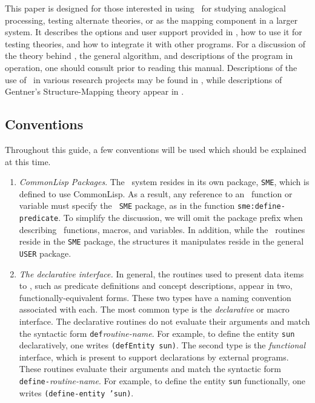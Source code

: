 This paper is designed for those interested in using \SME\ for studying
analogical processing, testing alternate theories, or as the mapping
component in a larger system. It describes the options and user support
provided in \SME, how to use it for testing theories, and how to integrate
it with other programs. For a discussion of the theory behind \SME, the
general algorithm, and descriptions of the program in operation, one should
consult \cite{aaai86,sme-aij} prior to reading this manual. Descriptions of
the use of \SME\ in various research projects may be found in
\cite{VBAL,MLW,DBR,Falken-phd,allerton,tinlap3,aaai87}, while descriptions
of Gentner's Structure-Mapping theory appear in
\cite{Gentner80,smt-cogsci,allerton,analogica,framework,sme-aij}.

\subsection{Conventions}

Throughout this guide, a few conventions will be used which should be
explained at this time.

\begin{enumerate}

 \item {\it CommonLisp Packages}. The \SME\ system resides
in its own package, {\tt SME}, which is defined to use CommonLisp. As a
result, any reference to an \SME\ function or variable must specify the {\tt
SME} package, as in the function {\tt sme:define-predicate}. To simplify the
discussion, we will omit the package prefix when describing \SME\ functions,
macros, and variables. In addition, while the \SME\ routines reside in the
{\tt SME} package, the structures it manipulates reside in the general {\tt
USER} package.
 \item {\it The declarative interface.}
In general, the routines used to present data items to \SME, such as
predicate definitions and concept descriptions, appear in two,
functionally-equivalent forms. These two types have a naming convention
associated with each. The most common type is the {\it declarative} or macro
interface. The declarative routines do not evaluate their arguments and
match the syntactic form {\tt def}{\it routine-name}. For example, to define
the entity {\tt sun} declaratively, one writes {\tt (defEntity sun)}. The
second type is the {\it functional} interface, which is present to support
declarations by external programs.  These routines evaluate their arguments
and match the syntactic form {\tt define-}{\it routine-name}. For example,
to define the entity {\tt sun} functionally, one writes {\tt (define-entity
'sun)}.

\end{enumerate}


